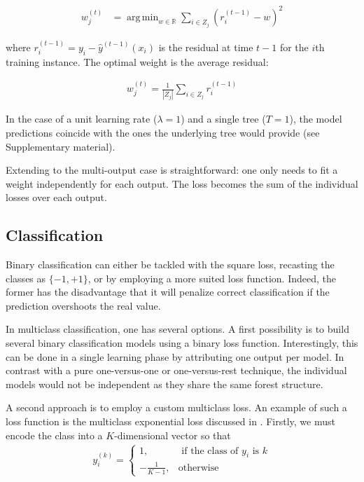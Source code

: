 \documentclass{article}
\DeclareMathOperator*{\argmin}{arg\,min}
\begin{document}
\vspace*{-\baselineskip}
\begin{align}\label{eq:L2min}
w_j^{(t)} &=  \argmin_{w \in \mathbb{R}} \sum_{i \in Z_j} \left(r_i^{(t-1)} - 
w\right)^2
\end{align}
\vspace*{-\baselineskip}

where $r_i^{(t-1)} = y_i - \hat{y}^{(t-1)}(x_i)$ is the residual at time $t-1$ 
for the $i$th training instance.
The optimal weight is the average residual:

\vspace*{-\baselineskip}
\begin{align}\label{eq:L2Solution}
w_j^{(t)} = \frac{1}{|Z_j|} \sum_{i \in Z_j} r_i^{(t-1)}
\end{align}
\vspace*{-\baselineskip}

In the case of a unit learning rate ($\lambda = 1$) and a single tree ($T=1$), 
the model predictions coincide with the ones the underlying tree would provide 
(see Supplementary material).

Extending to the multi-output case is straightforward: one only needs to fit a 
weight independently for each output. The loss becomes the sum of the 
individual losses over each output.

\subsection{Classification}
\label{subsec:classification}

Binary classification can either be tackled with the square loss, recasting the 
classes as $\{-1, +1\}$, or by employing a more suited loss function. Indeed, 
the former has the disadvantage that it will penalize correct classification if 
the prediction overshoots the real value.

In multiclass classification, one has several options. A first possibility is 
to build several binary classification models using a binary loss function. 
Interestingly, this can be done in a single learning phase by attributing one 
output per model. In contrast with a pure one-versus-one or one-versus-rest 
technique, the individual models would not be independent as they share the 
same forest structure.

A second approach is to employ a custom multiclass loss. An example of such a 
loss function is the multiclass exponential loss discussed in 
\cite{zhu2009multiadaboost}. Firstly, we must encode the class into a 
$K$-dimensional vector so that
\begin{align}\label{eq:MEencode}
y_i^{(k)} = \begin{cases}
1, &\text{ if the class of } y_i \text{ is } k \\
-\frac{1}{K-1}, &\text{otherwise}
\end{cases}
\end{align}
\vspace*{-\baselineskip}
\end{document}
